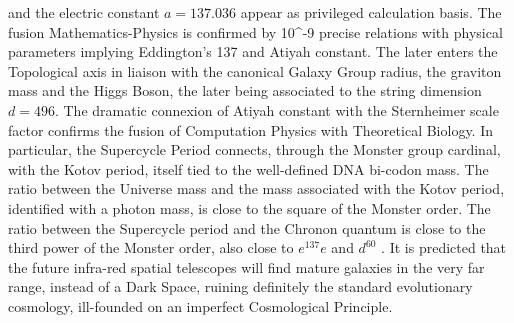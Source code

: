 and the electric constant $a = 137.036$ appear as privileged calculation basis. The fusion
Mathematics-Physics is confirmed by 10^{-9} precise relations with physical parameters
implying Eddington's 137 and Atiyah constant. The later enters the Topological axis in
liaison with the canonical Galaxy Group radius, the graviton mass and the Higgs Boson,
the later being associated to the string dimension $d = 496$. The dramatic connexion of
Atiyah constant with the Sternheimer scale factor confirms the fusion of Computation
Physics with Theoretical Biology. In particular, the Supercycle Period connects, through the
Monster group cardinal, with the Kotov period, itself tied to the well-defined DNA bi-codon
mass. The ratio between the Universe mass and the mass associated with the Kotov period,
identified with a photon mass, is close to the square of the Monster order. The ratio between
the Supercycle period and the Chronon quantum is close to the third power of the Monster
order, also close to $e^{137}e$ and $d^{60}$ . It is predicted that the future infra-red spatial telescopes
will find mature galaxies in the very far range, instead of a Dark Space, ruining definitely
the standard evolutionary cosmology, ill-founded on an imperfect Cosmological Principle.
